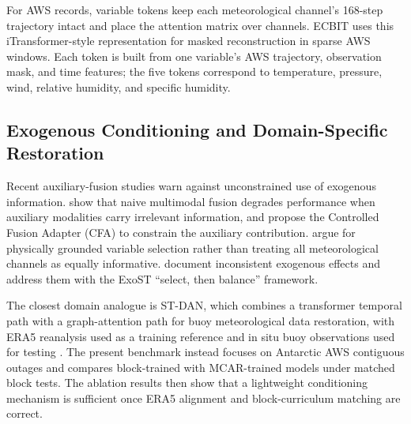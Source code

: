 For AWS records, variable tokens keep each meteorological channel's 168-step trajectory intact and place the attention matrix over channels. ECBIT uses this iTransformer-style representation for masked reconstruction in sparse AWS windows. Each token is built from one variable's AWS trajectory, observation mask, and time features; the five tokens correspond to temperature, pressure, wind, relative humidity, and specific humidity.

\subsection{Exogenous Conditioning and Domain-Specific Restoration}
Recent auxiliary-fusion studies warn against unconstrained use of exogenous information. \citet{lee2026constrainedfusion} show that naive multimodal fusion degrades performance when auxiliary modalities carry irrelevant information, and propose the Controlled Fusion Adapter (CFA) to constrain the auxiliary contribution. \citet{cao2026ecto} argue for physically grounded variable selection rather than treating all meteorological channels as equally informative. \citet{chen2025exost} document inconsistent exogenous effects and address them with the ExoST ``select, then balance'' framework.

The closest domain analogue is ST-DAN, which combines a transformer temporal path with a graph-attention path for buoy meteorological data restoration, with ERA5 reanalysis used as a training reference and in situ buoy observations used for testing \citep{song2026stdan}. The present benchmark instead focuses on Antarctic AWS contiguous outages and compares block-trained with MCAR-trained models under matched block tests. The ablation results then show that a lightweight conditioning mechanism is sufficient once ERA5 alignment and block-curriculum matching are correct.
